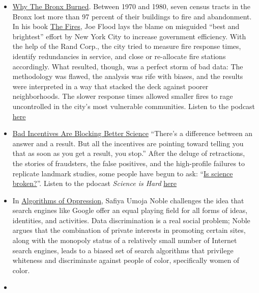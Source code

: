 \documentclass[
  a4paper,
  openany, a4paper, oneside]{book}
\providecommand{\tightlist}{%
  \setlength{\itemsep}{0pt}\setlength{\parskip}{0pt}}
\begin{document}
\begin{itemize}
\tightlist
\item
  \href{https://fivethirtyeight.com/features/why-the-bronx-really-burned/}{Why The Bronx Burned}. Between 1970 and 1980, seven census tracts in the Bronx lost more than 97 percent of their buildings to fire and abandonment. In his book \href{https://www.amazon.com/Fires-Computer-Intentions-City-Determined/dp/1594485062}{The Fires}, Joe Flood lays the blame on misguided ``best and brightest'' effort by New York City to increase government efficiency. With the help of the Rand Corp., the city tried to measure fire response times, identify redundancies in service, and close or re-allocate fire stations accordingly. What resulted, though, was a perfect storm of bad data: The methodology was flawed, the analysis was rife with biases, and the results were interpreted in a way that stacked the deck against poorer neighborhoods. The slower response times allowed smaller fires to rage uncontrolled in the city's most vulnerable communities. Listen to the podcast \href{https://podcasts.apple.com/us/podcast/19-why-the-bronx-burned/id1011406983?i=1000391467912}{here}
\item
  \href{https://fivethirtyeight.com/features/podcast-bad-incentives-are-blocking-better-science/}{Bad Incentives Are Blocking Better Science} ``There's a difference between an answer and a result. But all the incentives are pointing toward telling you that as soon as you get a result, you stop.'' After the deluge of retractions, the stories of fraudsters, the false positives, and the high-profile failures to replicate landmark studies, some people have begun to ask: ``\href{https://fivethirtyeight.com/features/science-isnt-broken/}{Is science broken?}''. Listen to the pdocast \emph{Science is Hard} \href{https://podcasts.apple.com/us/podcast/10-science-is-hard/id1011406983?i=1000391467935}{here}
\item
  In \href{https://nyupress.org/9781479837243/algorithms-of-oppression/}{Algorithms of Oppression}, Safiya Umoja Noble challenges the idea that search engines like Google offer an equal playing field for all forms of ideas, identities, and activities. Data discrimination is a real social problem; Noble argues that the combination of private interests in promoting certain sites, along with the monopoly status of a relatively small number of Internet search engines, leads to a biased set of search algorithms that privilege whiteness and discriminate against people of color, specifically women of color.
\item

\end{itemize}
\end{document}
